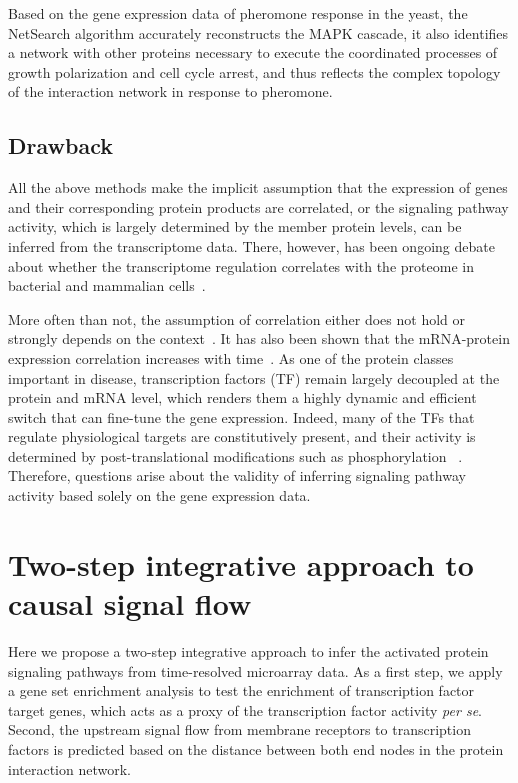Based on the gene expression data of pheromone response in the yeast, the 
NetSearch algorithm accurately reconstructs the MAPK cascade, it also identifies a 
network with other proteins necessary to execute the coordinated processes of 
growth polarization and cell cycle arrest, and thus 
reflects the complex topology of 
the interaction network in response to pheromone.

\subsection{Drawback}
All the above methods make the implicit assumption that the expression of genes
and their corresponding protein products are correlated, or the signaling 
pathway activity, which is largely determined by the member protein levels, 
can be inferred from the transcriptome data. There, however, 
has been ongoing debate 
about whether the transcriptome regulation correlates with the proteome
in bacterial and mammalian cells~\citep{Taniguchi2010,Ghazalpour2011}. 

More
often than not, the assumption of correlation either does not hold or strongly depends on the context~\citep{Soufi2009}. 
It has also been shown that the mRNA-protein expression correlation increases 
with time~\citep{Fournier2010}.
As one of the protein classes important in disease, 
transcription factors (TF) remain largely decoupled at the 
protein
and mRNA level, which renders them a highly dynamic and efficient switch that 
can fine-tune the gene expression. Indeed, many of the TFs that regulate physiological
    targets are constitutively present, and their activity is determined
    by post-translational modifications such as phosphorylation%
    ~\citep{Messina2004}.
Therefore, questions arise about the validity of inferring signaling 
pathway activity based solely on the gene expression data.

\section{Two-step integrative approach to causal signal flow}
Here we propose a two-step integrative approach to infer the activated protein signaling
pathways from time-resolved microarray data. As a first step, we apply a
gene set enrichment analysis to test the
enrichment of transcription factor target genes, which acts as a proxy of
the transcription factor activity \emph{per se}. Second, the upstream 
signal flow from membrane receptors to transcription factors is predicted 
based on the distance between both end nodes in the protein interaction
network.

